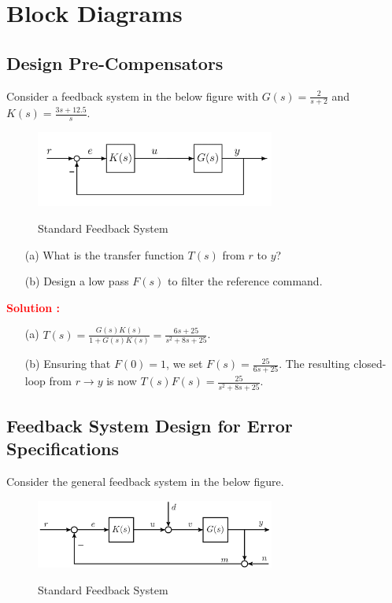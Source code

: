 \documentclass[12pt]{article}
\begin{document}
\section{Block Diagrams}
\subsection{Design Pre-Compensators}

Consider a feedback system in the below figure with $G(s) = \frac{2}{s+2}$ and $K(s) = \frac{3s + 12.5}{s}$.
\begin{figure}[h]
    \centering
    \includegraphics[width=0.7\textwidth]{figs/4.1.png}
    \label{fig:4.1}
    \caption{Standard Feedback System}
\end{figure}
\begin{itemize}
    \item[(a)]  What is the transfer function $T(s)$ from $r$ to $y$?
    \item[(b)] Design a low pass $F(s)$ to filter the reference command.
\end{itemize}

\textbf{\textcolor{red}{Solution :}}

\begin{itemize}
    \item[(a)] $T(s) = \frac{G(s)K(s)}{1+G(s)K(s)} = \frac{6s + 25}{s^2 + 8s + 25}$.
    \item[(b)] Ensuring that $F(0) = 1$, we set $F(s) = \frac{25}{6s+25}$. The resulting closed-loop from $r\rightarrow y$ is now $T(s)F(s) = \frac{25}{s^2+8s+25}$.
\end{itemize}
\clearpage

\subsection{Feedback System Design for Error Specifications}

Consider the general feedback system in the below figure.
\begin{figure}[h]
    \centering
    \includegraphics[width=0.7\textwidth]{figs/4.2.png}
    \label{fig:loop_97}
    \caption{Standard Feedback System}
\end{figure}
\end{document}
